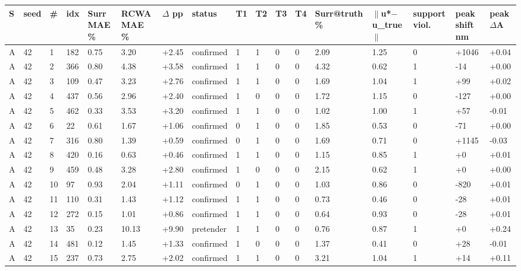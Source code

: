 \documentclass[11pt,a4paper]{article}
\newcounter{none}   %
\begin{document}
\begingroup
\setlength{\tabcolsep}{2pt}\tiny
{}
\label{stab:7}
{\def\LTcaptype{none} %
\begin{longtable}[]{@{}lllllllllllllllll@{}}
\toprule\noalign{}
S & seed & \# & idx & Surr MAE \% & RCWA MAE \% & \ensuremath{\Delta} pp & status & T1 & T2 & T3 & T4 & Surr@truth \% & \ensuremath{\|}u*\ensuremath{-}u\_true\ensuremath{\|} & support viol. & peak shift nm & peak \ensuremath{\Delta}A \\
\midrule\noalign{}
\endhead
\bottomrule\noalign{}
\endlastfoot
A & 42 & 1 & 182 & 0.75 & 3.20 & +2.45 & confirmed & 1 & 1 & 0 & 0 & 2.09 & 1.25 & 0 & +1046 & +0.04 \\
A & 42 & 2 & 366 & 0.80 & 4.38 & +3.58 & confirmed & 1 & 1 & 0 & 0 & 4.32 & 0.62 & 1 & -14 & +0.00 \\
A & 42 & 3 & 109 & 0.47 & 3.23 & +2.76 & confirmed & 1 & 1 & 0 & 0 & 1.69 & 1.04 & 1 & +99 & +0.02 \\
A & 42 & 4 & 437 & 0.56 & 2.96 & +2.40 & confirmed & 1 & 0 & 0 & 0 & 1.72 & 1.15 & 0 & -127 & +0.00 \\
A & 42 & 5 & 462 & 0.33 & 3.53 & +3.20 & confirmed & 1 & 1 & 0 & 0 & 1.02 & 1.00 & 1 & +57 & -0.01 \\
A & 42 & 6 & 22 & 0.61 & 1.67 & +1.06 & confirmed & 0 & 1 & 0 & 0 & 1.85 & 0.53 & 0 & -71 & +0.00 \\
A & 42 & 7 & 316 & 0.80 & 1.39 & +0.59 & confirmed & 0 & 1 & 0 & 0 & 1.69 & 0.71 & 0 & +1145 & -0.03 \\
A & 42 & 8 & 420 & 0.16 & 0.63 & +0.46 & confirmed & 1 & 1 & 0 & 0 & 1.15 & 0.85 & 1 & +0 & +0.01 \\
A & 42 & 9 & 459 & 0.48 & 3.28 & +2.80 & confirmed & 1 & 0 & 0 & 0 & 2.15 & 0.62 & 1 & +0 & +0.00 \\
A & 42 & 10 & 97 & 0.93 & 2.04 & +1.11 & confirmed & 0 & 1 & 0 & 0 & 1.03 & 0.86 & 0 & -820 & +0.01 \\
A & 42 & 11 & 110 & 0.31 & 1.43 & +1.12 & confirmed & 1 & 1 & 0 & 0 & 0.73 & 0.46 & 0 & -28 & +0.01 \\
A & 42 & 12 & 272 & 0.15 & 1.01 & +0.86 & confirmed & 1 & 1 & 0 & 0 & 0.64 & 0.93 & 0 & -28 & +0.01 \\
A & 42 & 13 & 35 & 0.23 & 10.13 & +9.90 & pretender & 1 & 1 & 0 & 0 & 0.76 & 0.87 & 1 & +0 & +0.24 \\
A & 42 & 14 & 481 & 0.12 & 1.45 & +1.33 & confirmed & 1 & 0 & 0 & 0 & 1.37 & 0.41 & 0 & +28 & -0.01 \\
A & 42 & 15 & 237 & 0.73 & 2.75 & +2.02 & confirmed & 1 & 1 & 0 & 0 & 3.21 & 1.04 & 1 & +14 & +0.11 \\

\end{longtable}}
\end{document}
